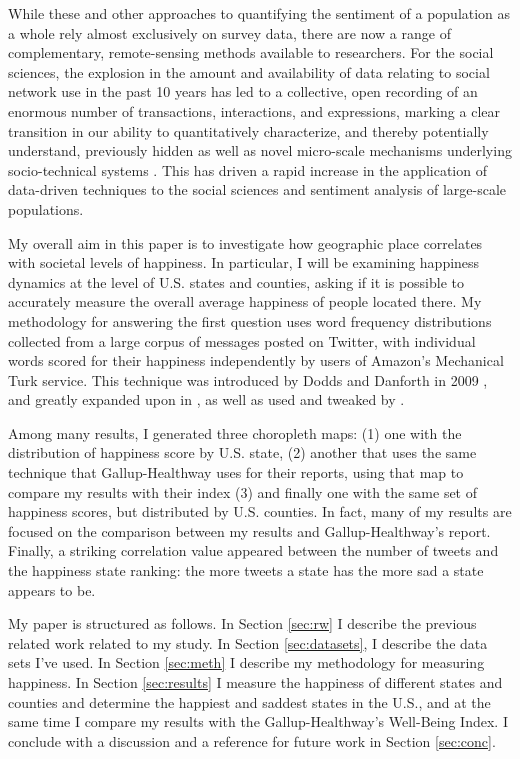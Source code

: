 \documentclass{llncs}
\begin{document}
While these and other approaches to quantifying the sentiment of a population as a whole rely almost exclusively on survey data, there are now a range of complementary, remote-sensing methods available to researchers. For the social sciences, the explosion in the amount and availability of data relating to social network use in the past 10 years has led to a collective, open recording of an enormous number of transactions, interactions, and expressions, marking a clear transition in our ability to quantitatively characterize, and thereby potentially understand, previously hidden as well as novel micro-scale mechanisms underlying socio-technical systems \cite{Miller2011}. This has driven a rapid increase in the application of data-driven techniques to the social sciences and sentiment analysis of large-scale populations.

My overall aim in this paper is to investigate how geographic place correlates with societal levels of happiness. In particular, I will be examining happiness dynamics at the level of U.S. states and counties, asking if it is possible to accurately measure the overall average happiness of people located there. My methodology for answering the first question uses word frequency distributions collected from a large corpus of messages posted on Twitter, with individual words scored for their happiness independently by users of Amazon's Mechanical Turk service. This technique was introduced by Dodds and Danforth in 2009 \cite{Dodds2009}, and greatly expanded upon in \cite{Dodds2011}, as well as used and tweaked by \cite{Mitchell2013}.

Among many results, I generated three choropleth maps: (1) one with the distribution of happiness score by U.S. state, (2) another that uses the same technique that Gallup-Healthway uses for their reports, using that map to compare my results with their index (3) and finally one with the same set of happiness scores, but distributed by U.S. counties. In fact, many of my results are focused on the comparison between my results and Gallup-Healthway's report. Finally, a striking correlation value appeared between the number of tweets and the happiness state ranking: the more tweets a state has the more sad a state appears to be.

My paper is structured as follows. In Section \ref{sec:rw} I describe the previous related work related to my study. In Section \ref{sec:datasets}, I describe the data sets I've used. In Section \ref{sec:meth} I describe my methodology for measuring happiness. In Section \ref{sec:results} I measure the happiness of different states and counties and determine the happiest and saddest states in the U.S., and at the same time I compare my results with the Gallup-Healthway's Well-Being Index. I conclude with a discussion and a reference for future work in Section \ref{sec:conc}.
\end{document}
